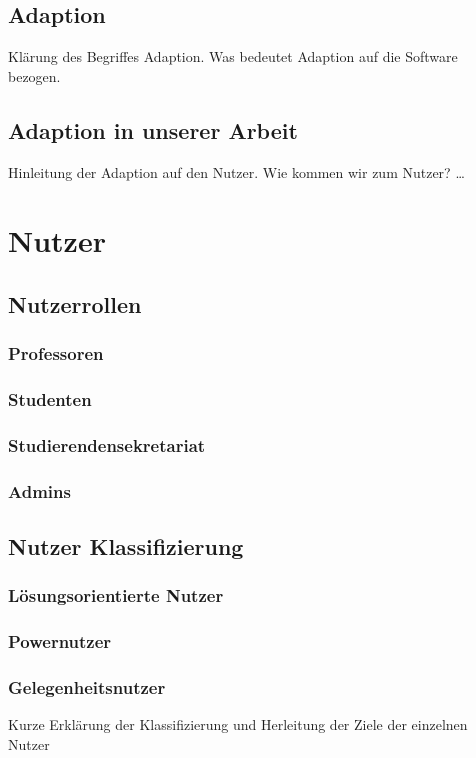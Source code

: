 \section{Adaption}
Klärung des Begriffes Adaption. Was bedeutet Adaption auf die Software bezogen.

\section{Adaption in unserer Arbeit}

Hinleitung der Adaption auf den Nutzer. Wie kommen wir zum Nutzer?
\dots




\chapter{Nutzer}

\section{Nutzerrollen}
\subsection{Professoren}
\subsection{Studenten}
\subsection{Studierendensekretariat}
\subsection{Admins}

\section{Nutzer Klassifizierung}

\subsection{Lösungsorientierte Nutzer}
\subsection{Powernutzer}
\subsection{Gelegenheitsnutzer}
Kurze Erklärung der Klassifizierung und Herleitung der Ziele der einzelnen Nutzer
\label{ch:Content1:sec:Section2}




